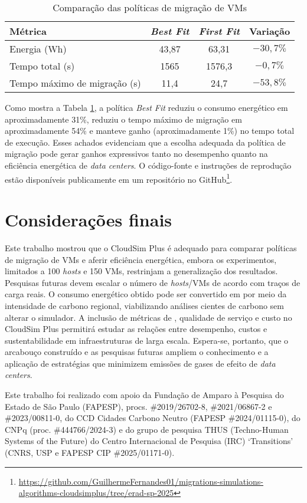\documentclass[12pt]{article}
\begin{document}
\begin{table}[ht]
  \centering
  \caption{Comparação das políticas de migração de VMs}
  \label{tab:resultados}
  \small
    \begin{tabular}{lccc}
      \toprule
      \textbf{Métrica} & \textbf{\textit{Best Fit}} & \textbf{\textit{First Fit}} & \textbf{Variação} \\
      \midrule
      Energia (Wh)              & 43,87 & 63,31 & \(-30,7\%\) \\
      Tempo total (s)           & 1565 & 1576,3 & \(-0,7\%\)  \\
      Tempo máximo de migração (s)   & 11,4 & 24,7 & \(-53,8\%\) \\
      \bottomrule
    \end{tabular}
\end{table}

Como mostra a Tabela \ref{tab:resultados}, a política \textit{Best Fit} reduziu o consumo energético em aproximadamente 31\%, reduziu o tempo máximo de migração em aproximadamente 54\% e manteve ganho (aproximadamente 1\%) no tempo total de execução. Esses achados evidenciam que a escolha adequada da política de migração pode gerar ganhos expressivos tanto no desempenho quanto na eficiência energética de \textit{data centers}. O código-fonte e instruções de reprodução estão disponíveis publicamente em um repositório no GitHub\footnote{\url{https://github.com/GuilhermeFernandes01/migrations-simulations-algorithms-cloudsimplus/tree/erad-sp-2025}}.

\section{Considerações finais}

Este trabalho mostrou que o CloudSim Plus é adequado para comparar políticas de migração de VMs e aferir eficiência energética, embora os experimentos, limitados a 100 \textit{hosts} e 150 VMs, restrinjam a generalização dos resultados. Pesquisas futuras devem escalar o número de \textit{hosts}/VMs de acordo com traços de carga reais. O consumo energético obtido pode ser convertido em  por meio da intensidade de carbono regional, viabilizando análises cientes de carbono sem alterar o simulador. A inclusão de métricas de , qualidade de serviço e custo no CloudSim Plus permitirá estudar as relações entre desempenho, custos e sustentabilidade em infraestruturas de larga escala. Espera-se, portanto, que o arcabouço construído e as pesquisas futuras ampliem o conhecimento e a aplicação de estratégias que minimizem emissões de gases de efeito de \textit{data centers}.

Este trabalho foi realizado com apoio da Fundação de Amparo à Pesquisa do Estado de São Paulo (FAPESP), procs. \mbox{\#2019/26702-8}, \mbox{\#2021/06867-2} e \mbox{\#2023/00811-0}, do CCD Cidades Carbono Neutro (FAPESP \mbox{\#2024/01115-0}), do CNPq (proc. \mbox{\#444766/2024-3}) e do grupo de pesquisa THUS (Techno-Human Systems of the Future) do Centro Internacional de Pesquisa (IRC) `Transitions' (CNRS, USP e FAPESP CIP \mbox{\#2025/01171-0}).

\renewcommand{\refname}{Referências}


\end{document}
